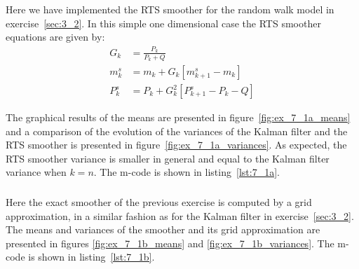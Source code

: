\documentclass[a4paper,oneside,article]{memoir}
\begin{document}
\section{}


\subsection{}
\subsubsection{}\label{sec:7_1a}
Here we have implemented the RTS smoother for the random walk model in exercise~\ref{sec:3_2}.
In this simple one dimensional case the RTS smoother equations are given by:
\begin{align}
	G_k &=\frac{P_k}{P_k+Q}\\
	m_k^s&=m_k+G_k\left[m_{k+1}^s-m_k\right]\\
	P_k^s&=P_k+G_k^2\left[P_{k+1}^s-P_{k}-Q\right]
\end{align}

The graphical results of the means are presented in figure~\ref{fig:ex_7_1a_means} and a comparison
of the evolution of the variances of the Kalman filter and the RTS smoother is presented in
figure~\ref{fig:ex_7_1a_variances}. As expected, the RTS smoother variance is smaller in general
and equal to the Kalman filter variance when $k=n$. The m-code is shown in listing~\ref{lst:7_1a}.

\clearpage




\subsubsection{}\label{sec:7_1b}
Here the exact smoother of the previous exercise is computed by a grid approximation,
in a similar fashion as for the Kalman filter in exercise~\ref{sec:3_2}. The means and variances
of the smoother and its grid approximation are presented in figures \ref{fig:ex_7_1b_means} and 
\ref{fig:ex_7_1b_variances}. The m-code is shown in listing~\ref{lst:7_1b}.
\end{document}
